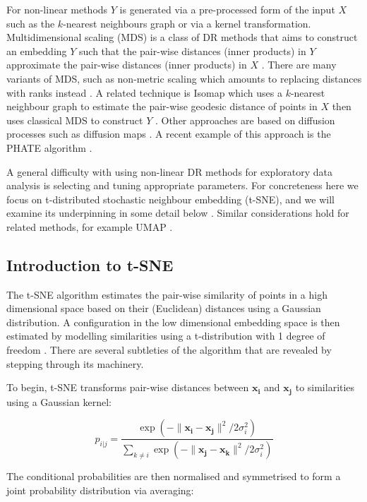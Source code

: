 \documentclass[article,notitle]{jdssv}
\begin{document}
For non-linear methods \(Y\) is generated via a pre-processed form of the input
\(X\) such as the \(k\)-nearest neighbours graph or via a kernel transformation.
Multidimensional scaling (MDS) is a class of DR methods that aims to construct
an embedding \(Y\) such that the pair-wise distances (inner products) in \(Y\)
approximate the pair-wise distances (inner products) in \(X\)
\citep{Torgerson1952-am, Kruskal1964-cz}. There are many
variants of MDS, such as non-metric scaling which amounts to replacing
distances with ranks instead \citep{Kruskal1964-cw}.
A related technique is Isomap which uses a \(k\)-nearest neighbour graph
to estimate the pair-wise geodesic distance of points in \(X\) then uses classical
MDS to construct \(Y\) \citep{Silva2003-xw}. Other approaches are based on diffusion
processes such as diffusion maps \citep{Coifman2005-ak}. A recent example of this
approach is the PHATE algorithm \citep{Moon2019-ce}.

A general difficulty with using
non-linear DR methods for exploratory data analysis is selecting and tuning
appropriate parameters. For concreteness here we focus on t-distributed
stochastic neighbour embedding (t-SNE), and we will examine
its underpinning in some detail below \citep{Maaten2008-sk}. Similar considerations hold for related
methods, for example UMAP \citep{McInnes2018-co}.

\hypertarget{introduction-to-t-sne}{%
\subsection{Introduction to t-SNE}\label{introduction-to-t-sne}}

The t-SNE algorithm estimates the pair-wise similarity of points in a high
dimensional space based on their (Euclidean) distances using a Gaussian
distribution. A configuration in the low dimensional embedding space is then
estimated by modelling similarities using a t-distribution with 1 degree of
freedom \citep{Maaten2008-sk}. There are several subtleties of the algorithm that
are revealed by stepping through its machinery.

To begin, t-SNE transforms pair-wise distances between \(\mathbf{x_i}\) and
\(\mathbf{x_j}\) to similarities using a Gaussian kernel:

\[ 
p_{i|j} = \frac{\exp(-\lVert \mathbf{x_i - x_j} \rVert ^ 2 /
2\sigma_i^2)}{\sum_{k \ne i}\exp(-\lVert \mathbf{x_j - x_k} \rVert ^ 2 /
2\sigma_i^2)} 
\]

The conditional probabilities are then normalised and symmetrised to form a
joint probability distribution via averaging:
\end{document}
